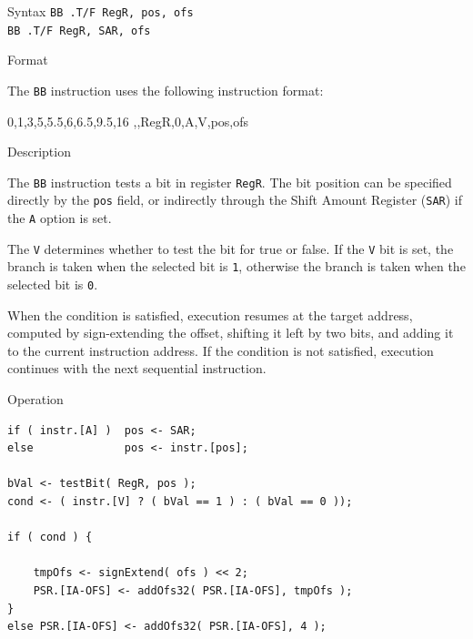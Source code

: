 \pagebreak
{}

\begin{iPageDescEntry}{Syntax} 
  \texttt{BB .T/F RegR, pos, ofs} \\
  \texttt{BB .T/F RegR, SAR, ofs}
\end{iPageDescEntry}

\begin{iPageDescEntry}{Format}

The \texttt{BB} instruction uses the following instruction format: \\

\begin{flushleft}
  \drawInstrFormat
    {0,1,3,5,5.5,6,6.5,9.5,16}
    {\OpCodeGrpBR,\OpCodeBB,RegR,0,A,V,pos,ofs}
\end{flushleft}

\end{iPageDescEntry}

\begin{iPageDescEntry}{Description}

The \texttt{BB} instruction tests a bit in register \texttt{RegR}.  
The bit position can be specified directly by the \texttt{pos} field,  
or indirectly through the Shift Amount Register (\texttt{SAR}) if the \texttt{A} option is set.  

The \texttt{V} determines whether to test the bit for true or false.
If the \texttt{V} bit is set, the branch is taken when the selected bit is \texttt{1}, otherwise the branch is taken when the selected bit is \texttt{0}.  

When the condition is satisfied, execution resumes at the target address,  
computed by sign-extending the offset, shifting it left by two bits,  
and adding it to the current instruction address. 
If the condition is not satisfied, execution continues with the next sequential instruction.  

\end{iPageDescEntry}

\begin{iPageDescOpEntry}{Operation}
\begin{lstlisting}[style=iPageOpStyle]
if ( instr.[A] )  pos <- SAR;
else              pos <- instr.[pos];

bVal <- testBit( RegR, pos );
cond <- ( instr.[V] ? ( bVal == 1 ) : ( bVal == 0 ));

if ( cond ) {

    tmpOfs <- signExtend( ofs ) << 2;
    PSR.[IA-OFS] <- addOfs32( PSR.[IA-OFS], tmpOfs );
}
else PSR.[IA-OFS] <- addOfs32( PSR.[IA-OFS], 4 );
\end{lstlisting}
\end{iPageDescOpEntry}

